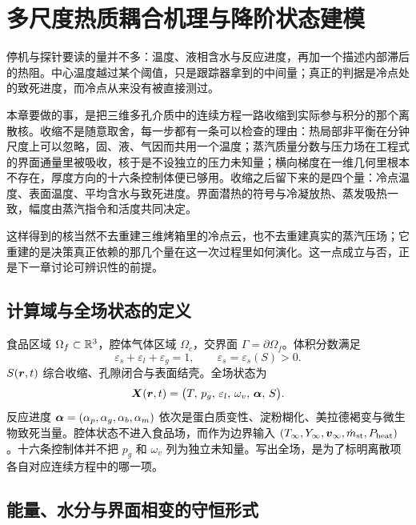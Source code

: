 \chapter{多尺度热质耦合机理与降阶状态建模}
\label{ch:physics}

停机与探针要读的量并不多：温度、液相含水与反应进度，再加一个描述内部滞后的热阻。中心温度越过某个阈值，只是跟踪器拿到的中间量；真正的判据是冷点处的致死进度，而冷点从来没有被直接测过。

本章要做的事，是把三维多孔介质中的连续方程一路收缩到实际参与积分的那个离散核。收缩不是随意取舍，每一步都有一条可以检查的理由：热局部非平衡在分钟尺度上可以忽略，固、液、气因而共用一个温度；蒸汽质量分数与压力场在工程式的界面通量里被吸收，核于是不设独立的压力未知量；横向梯度在一维几何里根本不存在，厚度方向的十六条控制体便已够用。收缩之后留下来的是四个量：冷点温度、表面温度、平均含水与致死进度。界面潜热的符号与冷凝放热、蒸发吸热一致，幅度由蒸汽指令和活度共同决定。

这样得到的核当然不去重建三维烤箱里的冷点云，也不去重建真实的蒸汽压场；它重建的是决策真正依赖的那几个量在这一次过程里如何演化。这一点成立与否，正是下一章讨论可辨识性的前提。

\section{计算域与全场状态的定义}

食品区域 \(\Omega_f\subset\mathbb{R}^3\)，腔体气体区域 \(\Omega_c\)，交界面 \(\Gamma=\partial\Omega_f\)。体积分数满足
\[
\varepsilon_s+\varepsilon_l+\varepsilon_g=1,\qquad \varepsilon_s=\varepsilon_s(S)>0.
\]
\(S(\bm{r},t)\) 综合收缩、孔隙闭合与表面结壳。全场状态为
\begin{equation}
\label{eq:state}
\bm{X}(\bm{r},t)=\big(T,\,p_g,\,\varepsilon_l,\,\omega_v,\,\bm{\alpha},\,S\big).
\end{equation}
反应进度 \(\bm{\alpha}=(\alpha_p,\alpha_g,\alpha_b,\alpha_m)\) 依次是蛋白质变性、淀粉糊化、美拉德褐变与微生物致死当量。腔体状态不进入食品场，而作为边界输入 \((T_\infty,Y_\infty,\bm{v}_\infty,\dot m_{\mathrm{st}},P_{\mathrm{heat}})\)。十六条控制体并不把 \(p_g\) 和 \(\omega_v\) 列为独立未知量。写出全场，是为了标明离散项各自对应连续方程中的哪一项。

\section{能量、水分与界面相变的守恒形式}

